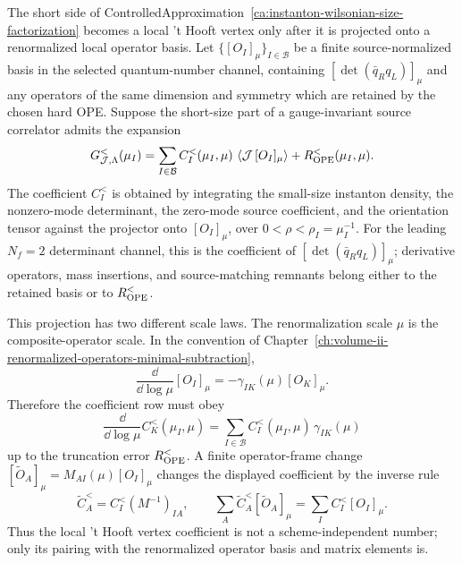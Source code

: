 \begin{controlledapproximation}
\label{ca:short-instanton-ope-coefficient}
The short side of
ControlledApproximation~\ref{ca:instanton-wilsonian-size-factorization} becomes
a local 't Hooft vertex only after it is projected onto a renormalized local
operator basis.  Let \(\{[O_I]_\mu\}_{I\in\mathcal B}\) be a finite
source-normalized basis in the selected quantum-number channel, containing
\([\det(\bar q_Rq_L)]_\mu\) and any operators of the same dimension and
symmetry which are retained by the chosen hard OPE.  Suppose the short-size
part of a gauge-invariant source correlator admits the expansion
\begin{equation}
  G_{\mathcal J,\Lambda}^{<}(\mu_I)
  =
  \sum_{I\in\mathcal B}
    C_I^{<}(\mu_I,\mu)\,
    \left\langle\mathcal J\,[O_I]_\mu\right\rangle
  +
  R_{\rm OPE}^{<}(\mu_I,\mu).
  \label{eq:short-instanton-ope-coefficient-expansion}
\end{equation}
The coefficient \(C_I^{<}\) is obtained by integrating the small-size instanton
density, the nonzero-mode determinant, the zero-mode source coefficient, and
the orientation tensor against the projector onto \([O_I]_\mu\), over
\(0<\rho<\rho_I=\mu_I^{-1}\).  For the leading \(N_f=2\) determinant channel,
this is the coefficient of \([\det(\bar q_Rq_L)]_\mu\); derivative operators,
mass insertions, and source-matching remnants belong either to the retained
basis or to \(R_{\rm OPE}^{<}\).

This projection has two different scale laws.  The renormalization scale
\(\mu\) is the composite-operator scale.  In the convention of
Chapter~\ref{ch:volume-ii-renormalized-operators-minimal-subtraction},
\[
  \frac{\dd}{\dd\log\mu}[O_I]_\mu
  =
  -\gamma_{IK}(\mu)[O_K]_\mu .
\]
Therefore the coefficient row must obey
\begin{equation}
  \frac{\dd}{\dd\log\mu}C_K^{<}(\mu_I,\mu)
  =
  \sum_{I\in\mathcal B}C_I^{<}(\mu_I,\mu)\,\gamma_{IK}(\mu)
  \label{eq:short-instanton-coefficient-rg}
\end{equation}
up to the truncation error \(R_{\rm OPE}^{<}\).  A finite operator-frame change
\([\widetilde O_A]_\mu=M_{AI}(\mu)[O_I]_\mu\) changes the displayed coefficient
by the inverse rule
\begin{equation}
  \widetilde C_A^{<}=C_I^{<}(M^{-1})_{IA},
  \qquad
  \sum_A\widetilde C_A^{<}[\widetilde O_A]_\mu
  =
  \sum_I C_I^{<}[O_I]_\mu .
  \label{eq:short-instanton-coefficient-frame-change}
\end{equation}
Thus the local 't Hooft vertex coefficient is not a scheme-independent number;
only its pairing with the renormalized operator basis and matrix elements is.


\end{controlledapproximation}

